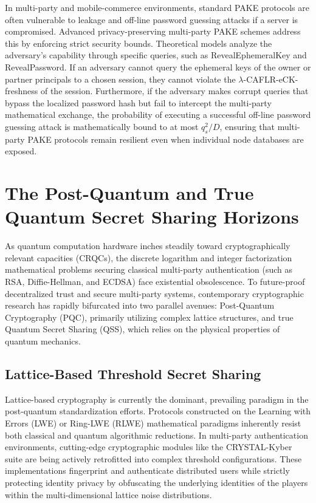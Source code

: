 \documentclass[11pt, a4paper]{article}
\begin{document}
In multi-party and mobile-commerce environments, standard PAKE protocols are often vulnerable to leakage and off-line password guessing attacks if a server is compromised. Advanced privacy-preserving multi-party PAKE schemes address this by enforcing strict security bounds. Theoretical models analyze the adversary's capability through specific queries, such as RevealEphemeralKey and RevealPassword. If an adversary cannot query the ephemeral keys of the owner or partner principals to a chosen session, they cannot violate the $\lambda$-CAFLR-eCK-freshness of the session. Furthermore, if the adversary makes corrupt queries that bypass the localized password hash but fail to intercept the multi-party mathematical exchange, the probability of executing a successful off-line password guessing attack is mathematically bound to at most $q_s^2/D$, ensuring that multi-party PAKE protocols remain resilient even when individual node databases are exposed.

\section*{The Post-Quantum and True Quantum Secret Sharing Horizons}
As quantum computation hardware inches steadily toward cryptographically relevant capacities (CRQCs), the discrete logarithm and integer factorization mathematical problems securing classical multi-party authentication (such as RSA, Diffie-Hellman, and ECDSA) face existential obsolescence. To future-proof decentralized trust and secure multi-party systems, contemporary cryptographic research has rapidly bifurcated into two parallel avenues: Post-Quantum Cryptography (PQC), primarily utilizing complex lattice structures, and true Quantum Secret Sharing (QSS), which relies on the physical properties of quantum mechanics.

\subsection*{Lattice-Based Threshold Secret Sharing}
Lattice-based cryptography is currently the dominant, prevailing paradigm in the post-quantum standardization efforts. Protocols constructed on the Learning with Errors (LWE) or Ring-LWE (RLWE) mathematical paradigms inherently resist both classical and quantum algorithmic reductions. In multi-party authentication environments, cutting-edge cryptographic modules like the CRYSTAL-Kyber suite are being actively retrofitted into complex threshold configurations. These implementations fingerprint and authenticate distributed users while strictly protecting identity privacy by obfuscating the underlying identities of the players within the multi-dimensional lattice noise distributions.
\end{document}
